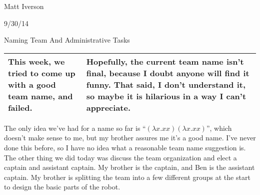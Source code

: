 Matt Iverson

9/30/14

Naming Team And Administrative Tasks

\begin{tabular}{|p{5cm}|p{5cm}|}
 \hline
 This week, we tried to come up with a good team name, and failed. &
 Hopefully, the current team name isn’t final, because I doubt anyone will find it funny. That said, I don’t understand it, so maybe it is hilarious in a way I can’t appreciate. \\
 \hline
\end{tabular}

The only idea we’ve had for a name so far is
“$(\lambda x.xx)(\lambda x.xx)$”,
which doesn’t make sense to me, but my brother assures me it’s a good name. I’ve never done this before, so I have no idea what a reasonable team name suggestion is.
	The other thing we did today was discuss the team organization and elect a captain and assistant captain. My brother is the captain, and Ben is the assistant captain. My brother is splitting the team into a few different groups at the start to design the basic parts of the robot.


